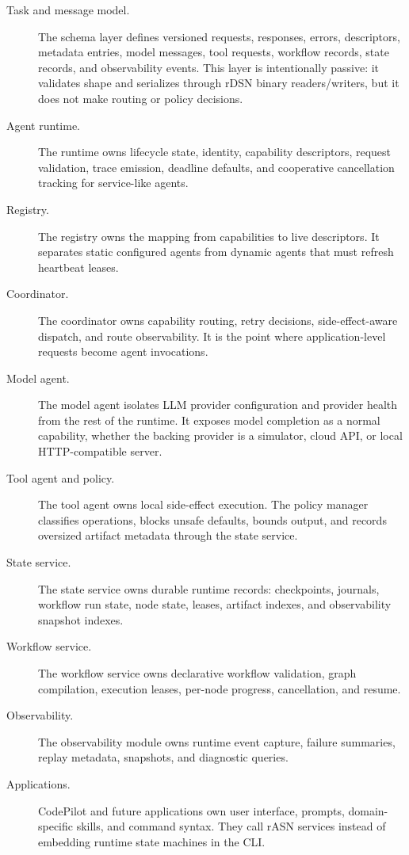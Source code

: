 \documentclass[manuscript,screen,review]{acmart}
\newcommand{\rasn}{rASN\xspace}
\newcommand{\rdsn}{rDSN\xspace}
\newcommand{\codepilot}{CodePilot\xspace}
\begin{document}
\begin{description}
  \item[Task and message model.] The schema layer defines versioned requests,
  responses, errors, descriptors, metadata entries, model messages, tool
  requests, workflow records, state records, and observability events. This
  layer is intentionally passive: it validates shape and serializes through
  \rdsn binary readers/writers, but it does not make routing or policy
  decisions.
  \item[Agent runtime.] The runtime owns lifecycle state, identity, capability
  descriptors, request validation, trace emission, deadline defaults, and
  cooperative cancellation tracking for service-like agents.
  \item[Registry.] The registry owns the mapping from capabilities to live
  descriptors. It separates static configured agents from dynamic agents that
  must refresh heartbeat leases.
  \item[Coordinator.] The coordinator owns capability routing, retry decisions,
  side-effect-aware dispatch, and route observability. It is the point where
  application-level requests become agent invocations.
  \item[Model agent.] The model agent isolates LLM provider configuration and
  provider health from the rest of the runtime. It exposes model completion as a
  normal capability, whether the backing provider is a simulator, cloud API, or
  local HTTP-compatible server.
  \item[Tool agent and policy.] The tool agent owns local side-effect execution.
  The policy manager classifies operations, blocks unsafe defaults, bounds
  output, and records oversized artifact metadata through the state service.
  \item[State service.] The state service owns durable runtime records:
  checkpoints, journals, workflow run state, node state, leases, artifact
  indexes, and observability snapshot indexes.
  \item[Workflow service.] The workflow service owns declarative workflow
  validation, graph compilation, execution leases, per-node progress,
  cancellation, and resume.
  \item[Observability.] The observability module owns runtime event capture,
  failure summaries, replay metadata, snapshots, and diagnostic queries.
  \item[Applications.] \codepilot and future applications own user interface,
  prompts, domain-specific skills, and command syntax. They call \rasn services
  instead of embedding runtime state machines in the CLI.
\end{description}
\end{document}

